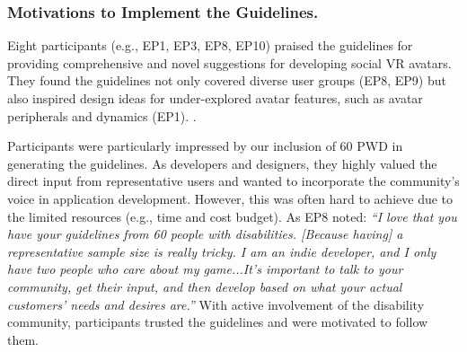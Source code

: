 
\subsubsection{Motivations to Implement the Guidelines.} \label{motivations}
Eight participants (e.g., EP1, EP3, EP8, EP10) 
praised the guidelines for providing comprehensive and novel suggestions for developing social VR avatars. They found the guidelines not only covered diverse user groups (EP8, EP9) but also inspired design ideas for under-explored avatar features, such as avatar peripherals and dynamics (EP1). . 

 Participants were particularly impressed by our inclusion of 60 PWD in generating the guidelines. As developers and designers, they highly valued the direct input from representative users and wanted to incorporate the community's voice in application development. However, this was often hard to achieve due to the limited resources (e.g., time and cost budget). As EP8 noted: \textit{``I love that you have your guidelines from 60 people with disabilities. [Because having] a representative sample size is really tricky. I am an indie developer, and I only have two people who care about my game...It's important to talk to your community, get their input, and then develop based on what your actual customers' needs and desires are.''} With active involvement of the disability community, participants trusted the guidelines and were motivated to follow them. %

